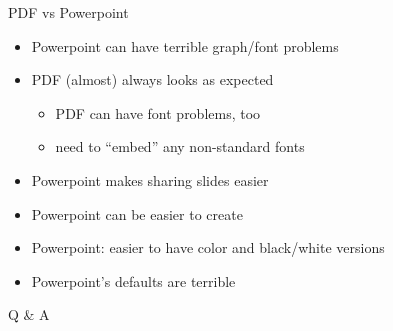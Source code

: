 \documentclass[12pt]{article}
\newcommand{\headsize}{\fontsize{35}{35} \selectfont}
\newcommand{\smallsize}{\fontsize{25}{30} \selectfont}
\begin{document}
\newpage

\headsize \color{myyellow}
\hfill \begin{minipage}{5.75in}
\centering
PDF vs Powerpoint
\end{minipage}

\vspace{3cm} \color{mywhite} \smallsize

\hfill \begin{minipage}{9.5in}

\begin{itemize}
\itemsep18pt
\item Powerpoint can have terrible graph/font problems

\item PDF (almost) always looks as expected
{\color{myblue}
\begin{itemize}
\item PDF can have font problems, too
\item need to ``embed'' any non-standard fonts
\end{itemize} }

\item Powerpoint makes sharing slides easier

\item Powerpoint can be easier to create

\item Powerpoint: easier to have color and black/white versions

\item Powerpoint's defaults are terrible

\end{itemize}

\end{minipage}




\newpage

\headsize \color{myyellow}
\hfill \begin{minipage}{5.75in}
\centering
Q \& A
\end{minipage}

\vspace{3cm} \color{mywhite} \smallsize
\end{document}

